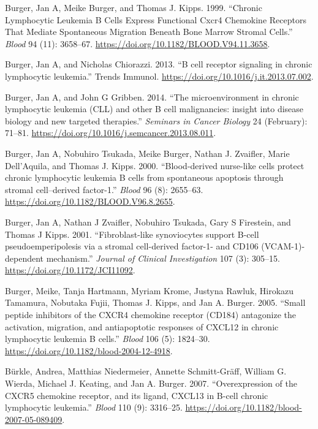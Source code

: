 \documentclass[11pt, a4paper, twosided]{book}
\newenvironment{CSLReferences}%
  {}%
  {\par}
\begin{document}
\begin{CSLReferences}{1}{0}
\leavevmode{}%
Burger, Jan A, Meike Burger, and Thomas J. Kipps. 1999. {``{Chronic Lymphocytic Leukemia B Cells Express Functional Cxcr4 Chemokine Receptors That Mediate Spontaneous Migration Beneath Bone Marrow Stromal Cells}.''} \emph{Blood} 94 (11): 3658--67. \url{https://doi.org/10.1182/BLOOD.V94.11.3658}.

\leavevmode{}%
Burger, Jan A, and Nicholas Chiorazzi. 2013. {``{B cell receptor signaling in chronic lymphocytic leukemia}.''} Trends Immunol. \url{https://doi.org/10.1016/j.it.2013.07.002}.

\leavevmode{}%
Burger, Jan A, and John G Gribben. 2014. {``{The microenvironment in chronic lymphocytic leukemia (CLL) and other B cell malignancies: insight into disease biology and new targeted therapies.}''} \emph{Seminars in Cancer Biology} 24 (February): 71--81. \url{https://doi.org/10.1016/j.semcancer.2013.08.011}.

\leavevmode{}%
Burger, Jan A, Nobuhiro Tsukada, Meike Burger, Nathan J. Zvaifler, Marie Dell'Aquila, and Thomas J. Kipps. 2000. {``{Blood-derived nurse-like cells protect chronic lymphocytic leukemia B cells from spontaneous apoptosis through stromal cell--derived factor-1}.''} \emph{Blood} 96 (8): 2655--63. \url{https://doi.org/10.1182/BLOOD.V96.8.2655}.

\leavevmode{}%
Burger, Jan A, Nathan J Zvaifler, Nobuhiro Tsukada, Gary S Firestein, and Thomas J Kipps. 2001. {``{Fibroblast-like synoviocytes support B-cell pseudoemperipolesis via a stromal cell-derived factor-1- and CD106 (VCAM-1)-dependent mechanism}.''} \emph{Journal of Clinical Investigation} 107 (3): 305--15. \url{https://doi.org/10.1172/JCI11092}.

\leavevmode{}%
Burger, Meike, Tanja Hartmann, Myriam Krome, Justyna Rawluk, Hirokazu Tamamura, Nobutaka Fujii, Thomas J. Kipps, and Jan A. Burger. 2005. {``{Small peptide inhibitors of the CXCR4 chemokine receptor (CD184) antagonize the activation, migration, and antiapoptotic responses of CXCL12 in chronic lymphocytic leukemia B cells}.''} \emph{Blood} 106 (5): 1824--30. \url{https://doi.org/10.1182/blood-2004-12-4918}.

\leavevmode{}%
Bürkle, Andrea, Matthias Niedermeier, Annette Schmitt-Gräff, William G. Wierda, Michael J. Keating, and Jan A. Burger. 2007. {``{Overexpression of the CXCR5 chemokine receptor, and its ligand, CXCL13 in B-cell chronic lymphocytic leukemia}.''} \emph{Blood} 110 (9): 3316--25. \url{https://doi.org/10.1182/blood-2007-05-089409}.


\end{CSLReferences}
\end{document}

